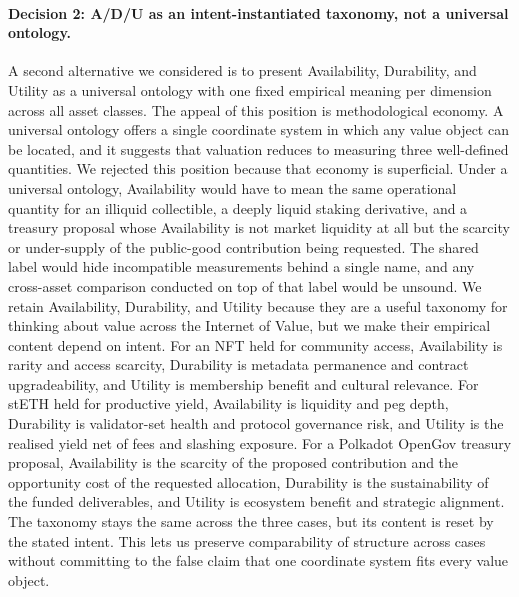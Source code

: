 \paragraph{Decision 2: A/D/U as an intent-instantiated taxonomy, not a universal ontology.}
A second alternative we considered is to present Availability, Durability, and Utility as a universal ontology with one fixed empirical meaning per dimension across all asset classes. The appeal of this position is methodological economy. A universal ontology offers a single coordinate system in which any value object can be located, and it suggests that valuation reduces to measuring three well-defined quantities. We rejected this position because that economy is superficial. Under a universal ontology, Availability would have to mean the same operational quantity for an illiquid collectible, a deeply liquid staking derivative, and a treasury proposal whose Availability is not market liquidity at all but the scarcity or under-supply of the public-good contribution being requested. The shared label would hide incompatible measurements behind a single name, and any cross-asset comparison conducted on top of that label would be unsound. We retain Availability, Durability, and Utility because they are a useful taxonomy for thinking about value across the Internet of Value, but we make their empirical content depend on intent. For an NFT held for community access, Availability is rarity and access scarcity, Durability is metadata permanence and contract upgradeability, and Utility is membership benefit and cultural relevance. For stETH held for productive yield, Availability is liquidity and peg depth, Durability is validator-set health and protocol governance risk, and Utility is the realised yield net of fees and slashing exposure. For a Polkadot OpenGov treasury proposal, Availability is the scarcity of the proposed contribution and the opportunity cost of the requested allocation, Durability is the sustainability of the funded deliverables, and Utility is ecosystem benefit and strategic alignment. The taxonomy stays the same across the three cases, but its content is reset by the stated intent. This lets us preserve comparability of structure across cases without committing to the false claim that one coordinate system fits every value object.


